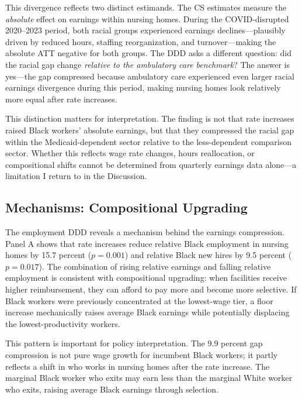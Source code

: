 \documentclass[12pt]{article}
\begin{document}
This divergence reflects two distinct estimands. The CS estimates measure the \textit{absolute} effect on earnings within nursing homes. During the COVID-disrupted 2020--2023 period, both racial groups experienced earnings declines---plausibly driven by reduced hours, staffing reorganization, and turnover---making the absolute ATT negative for both groups. The DDD asks a different question: did the racial gap change \textit{relative to the ambulatory care benchmark}? The answer is yes---the gap compressed because ambulatory care experienced even larger racial earnings divergence during this period, making nursing homes look relatively more equal after rate increases.

This distinction matters for interpretation. The finding is not that rate increases raised Black workers' absolute earnings, but that they compressed the racial gap within the Medicaid-dependent sector relative to the less-dependent comparison sector. Whether this reflects wage rate changes, hours reallocation, or compositional shifts cannot be determined from quarterly earnings data alone---a limitation I return to in the Discussion.



\subsection{Mechanisms: Compositional Upgrading}

The employment DDD reveals a mechanism behind the earnings compression.  Panel A shows that rate increases reduce relative Black employment in nursing homes by 15.7 percent ($p = 0.001$) and relative Black new hires by 9.5 percent ($p = 0.017$). The combination of rising relative earnings and falling relative employment is consistent with compositional upgrading: when facilities receive higher reimbursement, they can afford to pay more and become more selective. If Black workers were previously concentrated at the lowest-wage tier, a floor increase mechanically raises average Black earnings while potentially displacing the lowest-productivity workers.

This pattern is important for policy interpretation. The 9.9 percent gap compression is not pure wage growth for incumbent Black workers; it partly reflects a shift in who works in nursing homes after the rate increase. The marginal Black worker who exits may earn less than the marginal White worker who exits, raising average Black earnings through selection.
\end{document}
